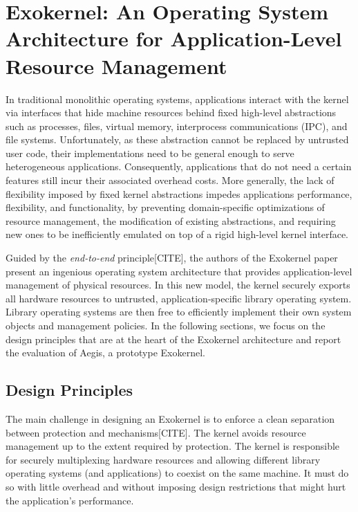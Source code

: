 \section{Exokernel: An Operating System Architecture for Application-Level Resource Management}

In traditional monolithic operating systems, applications interact with the kernel via interfaces that hide machine resources behind fixed high-level abstractions such as processes, files, virtual memory, interprocess communications (IPC), and file systems.
Unfortunately, as these abstraction cannot be replaced by untrusted user code, their implementations need to be general enough to serve heterogeneous applications.
Consequently, applications that do not need a certain features still incur their associated overhead costs.
More generally, the lack of flexibility imposed by fixed kernel abstractions impedes applications performance, flexibility, and functionality, by preventing domain-specific optimizations of resource management, the modification of existing abstractions, and requiring new ones to be inefficiently emulated on top of a rigid high-level kernel interface.

Guided by the \emph{end-to-end} principle[CITE], the authors of the Exokernel paper present an ingenious operating system architecture that provides application-level management of physical resources.
In this new model, the kernel securely exports all hardware resources to untrusted, application-specific library operating system.
Library operating systems are then free to efficiently implement their own system objects and management policies.
In the following sections, we focus on the design principles that are at the heart of the Exokernel architecture and report the evaluation of Aegis, a prototype Exokernel.

\subsection{Design Principles}
The main challenge in designing an Exokernel is to enforce a clean separation between protection and mechanisms[CITE].
The kernel avoids resource management up to the extent required by protection.
The kernel is responsible for securely multiplexing hardware resources and allowing different library operating systems (and applications) to coexist on the same machine.
It must do so with little overhead and without imposing design restrictions that might hurt the application's performance.

